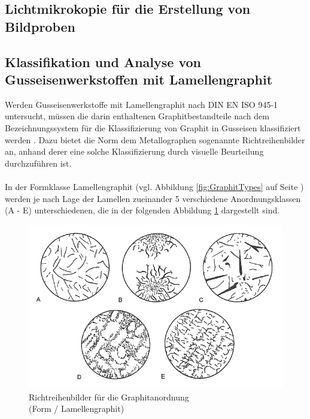 \documentclass[
fontsize=10pt, 
listof = totoc,
parskip = half	
]{report}
\newcommand{\uproman}[1]{\uppercase\expandafter{\romannumeral#1}}
\begin{document}
\subsection{Lichtmikrokopie für die Erstellung von Bildproben}
\label{subsec:Lichtmikroskopie}

\subsection{Klassifikation und Analyse von Gusseisenwerkstoffen mit Lamellengraphit}
\label{subsec:MethodenBestAnordnungsklassen}
Werden Gusseisenwerkstoffe mit Lamellengraphit nach DIN EN ISO 945-1 untersucht, müssen die darin enthaltenen Graphitbestandteile nach dem Bezeichnungssystem für die Klassifizierung von Graphit in Gusseisen klassifiziert  werden \cite[Seite 6]{ISO945}. Dazu bietet die Norm dem Metallographen sogenannte Richtreihenbilder an, anhand derer eine solche Klassifizierung durch visuelle Beurteilung durchzuführen ist.
\\\\
In der Formklasse Lamellengraphit (vgl. Abbildung \ref{fig:GraphitTypes} auf Seite \pageref{fig:GraphitTypes}) werden je nach Lage der Lamellen zueinander 5 verschiedene Anordnungsklassen (A - E) unterschiedenen, die in der folgenden Abbildung \ref{fig:Anordnungsklassen} dargestellt sind.

\begin{figure}[H]
	\centering
	\includegraphics[scale=0.5]{pics/Anordnungsklassen}
	\caption{Richtreihenbilder für die Graphitanordnung\\ (Form \uproman{1} / Lamellengraphit) \cite{ISO945}}
	\label{fig:Anordnungsklassen}
\end{figure}
\end{document}
